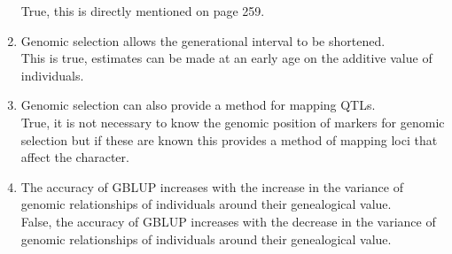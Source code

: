 \documentclass[12pt]{amsart}
\begin{document}
\begin{enumerate}
True, this is directly mentioned on page 259.\\
\item Genomic selection allows the generational interval to be shortened.\\
This is true, estimates can be made at an early age on the additive value of individuals.\\
\item Genomic selection can also provide a method for mapping QTLs.\\
True, it is not necessary to know the genomic position of markers for genomic selection but if these are known this provides a method of mapping loci that affect the character.\\
\item The accuracy of GBLUP increases with the increase in the variance of genomic relationships of individuals around their genealogical value.\\
False, the accuracy of GBLUP increases with the decrease in the variance of genomic relationships of individuals around their genealogical value.\\
\medskip
\end{enumerate}
\end{document}

